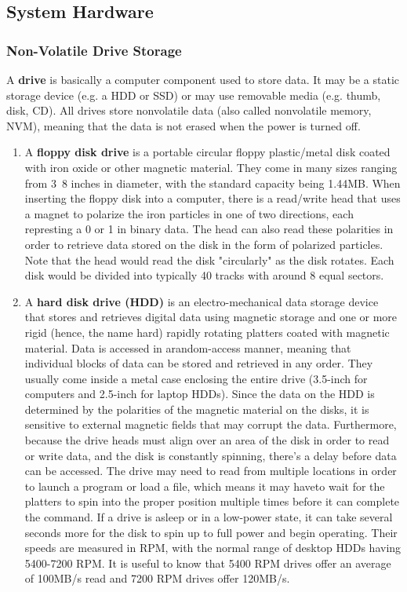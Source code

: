 \documentclass{article}
\begin{document}
  \subsection{System Hardware}

    \subsubsection{Non-Volatile Drive Storage}

      A \textbf{drive} is basically a computer component used to store data. It may be a static storage device (e.g. a HDD or SSD) or may use removable media (e.g. thumb, disk, CD). All drives store nonvolatile data (also called nonvolatile memory, NVM), meaning that the data is not erased when the power is turned off.
      \begin{enumerate}
        \item A \textbf{floppy disk drive} is a portable circular floppy plastic/metal disk coated with iron oxide or other magnetic material. They come in many sizes ranging from 3~8 inches in diameter, with the standard capacity being 1.44MB. When inserting the floppy disk into a computer, there is a read/write head that uses a magnet to polarize the iron particles in one of two directions, each represting a 0 or 1 in binary data. The head can also read these polarities in order to retrieve data stored on the disk in the form of polarized particles. Note that the head would read the disk "circularly" as the disk rotates. Each disk would be divided into typically 40 tracks with around 8 equal sectors.

        \item A \textbf{hard disk drive (HDD)} is an electro-mechanical data storage device that stores and retrieves digital data using magnetic storage and one or more rigid (hence, the name hard) rapidly rotating platters coated with magnetic material. Data is accessed in arandom-access manner, meaning that individual blocks of data can be stored and retrieved in any order. They usually come inside a metal case enclosing the entire drive (3.5-inch for computers and 2.5-inch for laptop HDDs). Since the data on the HDD is determined by the polarities of the magnetic material on the disks, it is sensitive to external magnetic fields that may corrupt the data. Furthermore, because the drive heads must align over an area of the disk in order to read or write data, and the disk is constantly spinning, there’s a delay before data can be accessed. The drive may need to read from multiple locations in order to launch a program or load a file, which means it may haveto wait for the platters to spin into the proper position multiple times before it can complete the command. If a drive is asleep or in a low-power state, it can take several seconds more for the disk to spin up to full power and begin operating. Their speeds are measured in RPM, with the normal range of desktop HDDs having 5400-7200 RPM. It is useful to know that 5400 RPM drives offer an average of 100MB/s read and 7200 RPM drives offer 120MB/s.


\end{enumerate}
\end{document}
